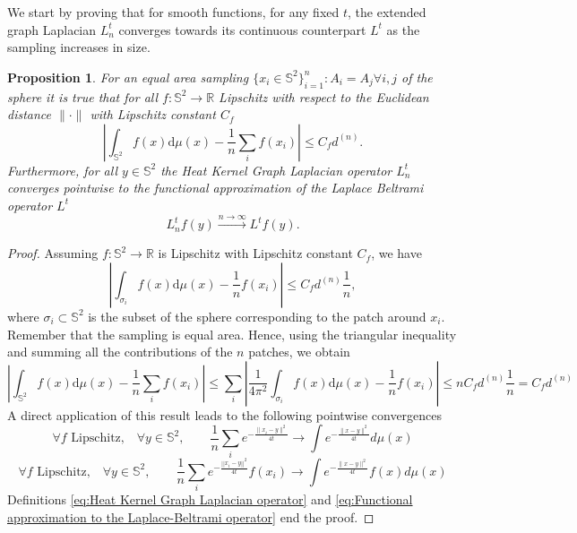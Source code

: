 \documentclass{article} %
\newtheorem{prop}{Proposition}
\newcommand{\R}{\mathbb{R}}
\renewcommand{\S}{\mathbb{S}}
\begin{document}
We start by proving that for smooth functions, for any fixed $t$, the extended graph Laplacian $L^t_n$ converges towards its continuous counterpart $L^t$ as the sampling increases in size.
\begin{prop}\label{prop:1}
	For an equal area sampling $\{x_i\in\S^2\}_{i=1}^n: A_i=A_j \forall i,j$ of the sphere it is true that for all $f: \S^2 \rightarrow \R$ Lipschitz with respect to the Euclidean distance $\|\cdot\|$ with Lipschitz constant $C_f$
	\begin{equation*}
	\left| \int_{\S^2}f({ x})\text{d}{\mu(x)} - \frac{1}{n}\sum_i f( x_i)\right|\leq C_f d^{(n)}.
	\end{equation*}
	Furthermore, for all $y\in\S^2$ the Heat Kernel Graph Laplacian operator $L^t_n$ converges pointwise to the functional approximation of the Laplace Beltrami operator $L^t$
	\begin{equation*}
	 L_n^tf(y)\xrightarrow{n\to\infty} L^tf(y).
	\end{equation*}
\end{prop}
\begin{proof}

	Assuming $f:\mathbb S^2 \rightarrow \R$ is Lipschitz with Lipschitz constant $C_f$, we have
	\begin{equation*}
	\left| \int_{\sigma_{i}}f({ x})\text{d}{\mu(x)} - \frac{1}{n}f( x_i)\right| \leq C_fd^{(n)}\frac{1}{n},
	\end{equation*}
	where $\sigma_i\subset \S^2$ is the subset of the sphere corresponding to the patch around $x_i$. Remember that the sampling is equal area.
	Hence, using the triangular inequality and summing all the contributions of the $n$ patches, we obtain
	\begin{equation*}
	\left| \int_{\S^2}f({ x})\text{d}{\mu(x)} - \frac{1}{n}\sum_i f( x_i)\right| \leq \sum_i \left| \frac{1}{4\pi^2} \int_{\sigma_{i}}f({ x})\text{d}{\mu(x)} - \frac{1}{n}f( x_i)\right|\leq n  C_fd^{(n)}\frac{1}{n} = C_fd^{(n)}
	\end{equation*}
	A direct application of this result leads to the following pointwise convergences
	\begin{equation*}
	\forall f \text{ Lipschitz,}\quad \forall y\in\S^2,  \quad\quad \frac{1}{n}\sum_i e^{-\frac{\|x_i-y\|^2}{4t}}\rightarrow   \int e^{-\frac{\|x-y\|^2}{4t}}d\mu(x)
	\end{equation*}
    \begin{equation*}
    \forall f \text{ Lipschitz,}\quad \forall y\in\S^2,  \quad\quad \frac{1}{n}\sum_i e^{-\frac{||x_i-y||^2}{4t}}f(x_i)\rightarrow   \int e^{-\frac{\|x-y\|^2}{4t}}f(x)d\mu(x)
    \end{equation*}
	Definitions \ref{eq:Heat Kernel Graph Laplacian operator} and \ref{eq:Functional approximation to the Laplace-Beltrami operator} end the proof.
\end{proof}
\end{document}
